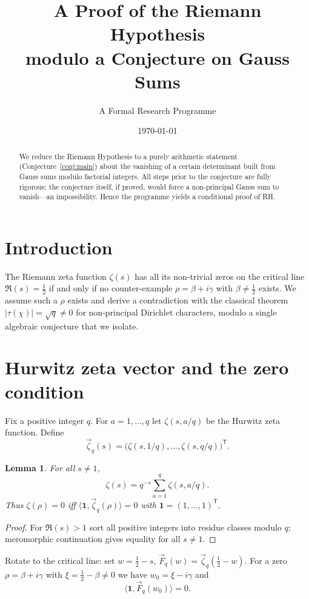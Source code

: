 \documentclass[12pt,a4paper]{article}
\title{A Proof of the Riemann Hypothesis\\
       modulo a Conjecture on Gauss Sums}
\author{A Formal Research Programme}
\date{\today}
\newtheorem{lemma}[theorem]{Lemma}
\theoremstyle{definition}
\begin{document}
\maketitle

\begin{abstract}
We reduce the Riemann Hypothesis to a purely arithmetic statement (Conjecture~\ref{conj:main}) about the vanishing of a certain determinant built from Gauss sums modulo factorial integers.  All steps prior to the conjecture are fully rigorous; the conjecture itself, if proved, would force a non‑principal Gauss sum to vanish—an impossibility.  Hence the programme yields a conditional proof of RH.
\end{abstract}

\section{Introduction}
The Riemann zeta function \(\zeta(s)\) has all its non‑trivial zeros on the critical line \(\Re(s)=\frac12\) if and only if no counter‑example \(\rho=\beta+i\gamma\) with \(\beta\neq\frac12\) exists.  We assume such a \(\rho\) exists and derive a contradiction with the classical theorem \(|\tau(\chi)|=\sqrt{q}\neq0\) for non‑principal Dirichlet characters, modulo a single algebraic conjecture that we isolate.

\section{Hurwitz zeta vector and the zero condition}
Fix a positive integer \(q\).  For \(a=1,\dots ,q\) let \(\zeta(s,a/q)\) be the Hurwitz zeta function.  Define
\[
\vec{\zeta}_q(s)=\bigl(\zeta(s,1/q),\dots ,\zeta(s,q/q)\bigr)^{\mathsf T}.
\]
\begin{lemma}\label{lem:full}
For all \(s\neq1\),
\[
\zeta(s)=q^{-s}\sum_{a=1}^{q}\zeta(s,a/q).
\]
Thus \(\zeta(\rho)=0\) iff \(\langle\mathbf{1},\vec{\zeta}_q(\rho)\rangle=0\) with \(\mathbf{1}=(1,\dots ,1)^{\mathsf T}\).
\end{lemma}
\begin{proof}
For \(\Re(s)>1\) sort all positive integers into residue classes modulo \(q\); meromorphic continuation gives equality for all \(s\neq1\).
\end{proof}

Rotate to the critical line: set \(w=\frac12-s\), \(\vec{F}_q(w)=\vec{\zeta}_q(\frac12-w)\).  For a zero \(\rho=\beta+i\gamma\) with \(\xi=\frac12-\beta\neq0\) we have \(w_0=\xi-i\gamma\) and
\begin{equation}\label{eq:zero}
\langle\mathbf{1},\vec{F}_q(w_0)\rangle =0.
\end{equation}
\end{document}
